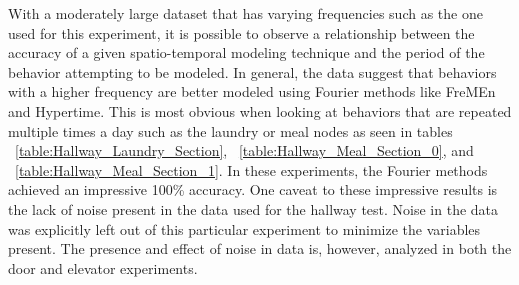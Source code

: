 With a moderately large dataset that has varying frequencies such as the one
used for this experiment, it is possible to observe a relationship between the accuracy
of a given spatio-temporal modeling technique and the period of the behavior
attempting to be modeled. In general, the data suggest that behaviors with
a higher frequency are better modeled using Fourier methods like FreMEn and
Hypertime. This is most obvious when looking at behaviors that are repeated multiple
times a day such as the laundry or meal nodes as seen in tables
~\ref{table:Hallway_Laundry_Section},
~\ref{table:Hallway_Meal_Section_0}, and
~\ref{table:Hallway_Meal_Section_1}. In these experiments, the Fourier
methods achieved an impressive 100\% accuracy.
One caveat to these impressive results is the lack of noise
present in the data used for the hallway test. Noise in the data was
explicitly left out of this particular experiment to minimize the variables
present. The presence and effect of noise in data is, however, analyzed in
both the door and elevator experiments. \\

\begin{table}[h!]
  \centering
  \caption{Hallway Laundry Section}
  \label{table:Hallway_Laundry_Section}
\end{table}

\begin{table}[h!]
  \centering
  \caption{Hallway Meal Section 0}
  \label{table:Hallway_Meal_Section_0}
\end{table}

